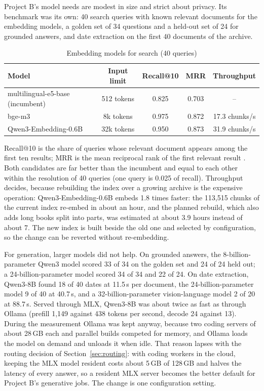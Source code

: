 Project B's model needs are modest in size and strict about privacy. Its benchmark was its own: 40 search queries
with known relevant documents for the embedding models, a golden set of 34 questions and a held-out set of 24 for
grounded answers, and date extraction on the first 40 documents of the archive.

\begin{table}[htbp]
\centering
\small
\caption{Embedding models for search (40 queries)}\label{tab:embed}
\begin{tabular}{lcccc}
\toprule
Model & Input limit & Recall@10 & MRR & Throughput \\
\midrule
multilingual-e5-base (incumbent) & 512 tokens & 0.825 & 0.703 & -- \\
bge-m3 & 8k tokens & 0.975 & 0.872 & 17.3 chunks/s \\
Qwen3-Embedding-0.6B & 32k tokens & 0.950 & 0.873 & 31.9 chunks/s \\
\bottomrule
\end{tabular}
\end{table}

Recall@10 is the share of queries whose relevant document appears among the first ten results; MRR is the mean
reciprocal rank of the first relevant result \citep{Manning-2008aa}. Both candidates are far better than the incumbent
and equal to each other within the resolution of 40 queries (one query is 0.025 of recall). Throughput decides,
because rebuilding the index over a growing archive is the expensive operation: Qwen3-Embedding-0.6B embeds 1.8 times
faster: the 113{,}515 chunks of the current index re-embed in about an hour, and the planned rebuild, which also adds
long books split into parts, was estimated at about 3.9 hours instead of about 7. The new index is built beside the old one and selected
by configuration, so the change can be reverted without re-embedding.

For generation, larger models did not help. On grounded answers, the 8-billion-parameter Qwen3 model scored 33 of 34
on the golden set and 24 of 24 held out; a 24-billion-parameter model scored 34 of 34 and 22 of 24. On date
extraction, Qwen3-8B found 18 of 40 dates at 11.5\,s per document, the 24-billion-parameter model 9 of 40 at 40.7\,s,
and a 32-billion-parameter vision-language model 2 of 20 at 88.7\,s. Served through MLX, Qwen3-8B was about twice as
fast as through Ollama (prefill 1{,}149 against 438 tokens per second, decode 24 against 13). During the measurement Ollama was kept anyway, because two coding servers of about 28\,GB each
and parallel builds competed for memory, and Ollama loads the model on demand and unloads it when idle. That reason
lapses with the routing decision of Section~\ref{sec:routing}: with coding workers in the cloud, keeping the MLX model
resident costs about 5\,GB of 128\,GB and halves the latency of every answer, so a resident MLX server becomes the
better default for Project B's generative jobs. The change is one configuration setting.

